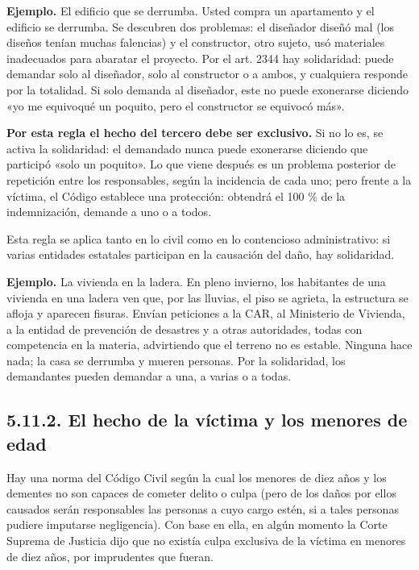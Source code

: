 \begin{ejemplo}
\textcolor[HTML]{4F6228}{\textbf{Ejemplo. }}El edificio que se derrumba. Usted compra un apartamento y el edificio se derrumba. Se descubren dos problemas: el diseñador diseñó mal (los diseños tenían muchas falencias) y el constructor, otro sujeto, usó materiales inadecuados para abaratar el proyecto. Por el art. 2344 hay solidaridad: puede demandar solo al diseñador, solo al constructor o a ambos, y cualquiera responde por la totalidad. Si solo demanda al diseñador, este no puede exonerarse diciendo «yo me equivoqué un poquito, pero el constructor se equivocó más».
\end{ejemplo}
\textbf{Por esta regla el hecho del tercero debe ser exclusivo.} Si no lo es, se activa la solidaridad: el demandado nunca puede exonerarse diciendo que participó «solo un poquito». Lo que viene después es un problema posterior de repetición entre los responsables, según la incidencia de cada uno; pero frente a la víctima, el Código establece una protección: obtendrá el 100 \% de la indemnización, demande a uno o a todos.

Esta regla se aplica tanto en lo civil como en lo contencioso administrativo: si varias entidades estatales participan en la causación del daño, hay solidaridad.

\begin{ejemplo}
\textcolor[HTML]{4F6228}{\textbf{Ejemplo. }}La vivienda en la ladera. En pleno invierno, los habitantes de una vivienda en una ladera ven que, por las lluvias, el piso se agrieta, la estructura se afloja y aparecen fisuras. Envían peticiones a la CAR, al Ministerio de Vivienda, a la entidad de prevención de desastres y a otras autoridades, todas con competencia en la materia, advirtiendo que el terreno no es estable. Ninguna hace nada; la casa se derrumba y mueren personas. Por la solidaridad, los demandantes pueden demandar a una, a varias o a todas.
\end{ejemplo}
\subsection{5.11.2. El hecho de la víctima y los menores de edad}
Hay una norma del Código Civil según la cual los menores de diez años y los dementes no son capaces de cometer delito o culpa (pero de los daños por ellos causados serán responsables las personas a cuyo cargo estén, si a tales personas pudiere imputarse negligencia). Con base en ella, en algún momento la Corte Suprema de Justicia dijo que no existía culpa exclusiva de la víctima en menores de diez años, por imprudentes que fueran.

